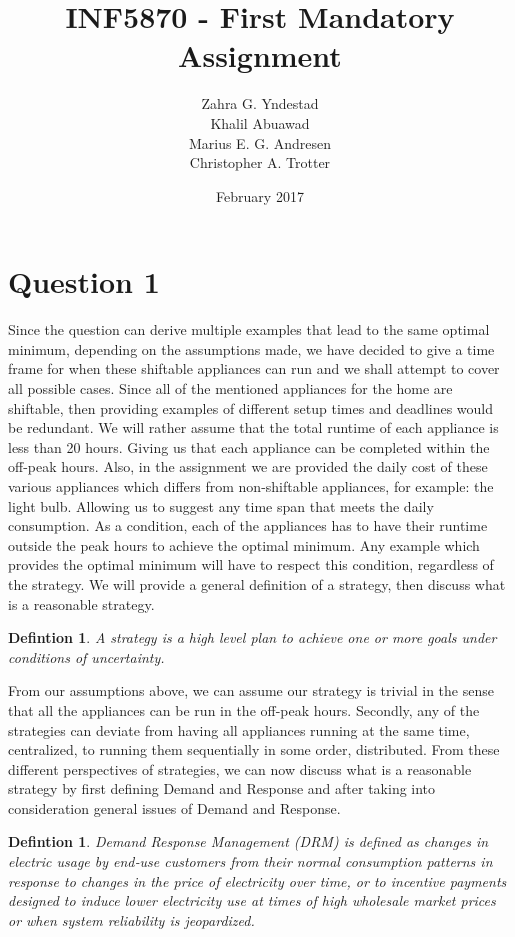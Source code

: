 \documentclass{article}
\title{INF5870 - First Mandatory Assignment}
\author{Zahra G. Yndestad \\ Khalil Abuawad \\ Marius E. G. Andresen \\ Christopher A. Trotter}
\date{February 2017}
\newtheorem{definition}[theorem]{Defintion}
\begin{document}
\maketitle

\section{Question 1}
	Since the question can derive multiple examples that lead to the same optimal minimum, depending on the assumptions made, we have decided to give a time frame for when these shiftable appliances can run and we shall attempt to cover all possible cases. Since all of the mentioned appliances for the home are shiftable, then providing examples of different setup times and deadlines would be redundant. We will rather assume that the total runtime of each appliance is less than 20 hours. Giving us that each appliance can be completed within the off-peak hours. Also, in the assignment we are provided the daily cost of these various appliances which differs from non-shiftable appliances, for example: the light bulb. Allowing us to suggest any time span that meets the daily consumption.  As a condition, each of the appliances has to have their runtime outside the peak hours to achieve the optimal minimum. Any example which provides the optimal minimum will have to respect this condition, regardless of the strategy. We will provide a general definition of a strategy, then discuss what is a reasonable strategy.
	
	\begin{definition}
    	A strategy is a high level plan to achieve one or more goals under conditions of uncertainty{\cite{wikistrategy}}. 
	\end{definition}
	
	From our assumptions above, we can assume our strategy is trivial in the sense that all the appliances can be run in the off-peak hours. Secondly, any of the strategies can deviate from having all appliances running at the same time, centralized, to running them sequentially in some order, distributed. From these different perspectives of strategies, we can now discuss what is a reasonable strategy by first defining Demand and Response and after taking into consideration general issues of Demand and Response.
	
	\begin{definition}
	    Demand Response Management (DRM) is defined as changes in electric usage by end‐use customers from their normal consumption patterns in response to changes in the price of electricity over time, or to incentive payments designed to induce lower electricity use at times of high wholesale market prices or when system reliability is jeopardized\cite{defDRM}.
	\end{definition}
	
\end{document}
